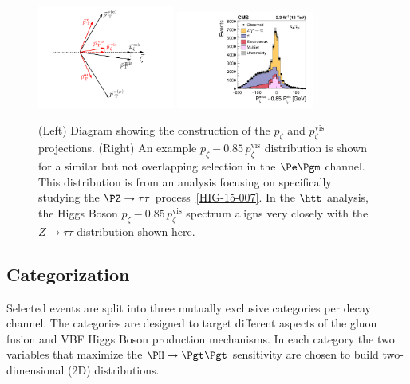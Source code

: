 \begin{figure}[htbp]
\centering
     \includegraphics[width=0.4\textwidth]{higgs_to_taus/plots/pZeta_def.pdf}
     \includegraphics[width=0.4\textwidth]{higgs_to_taus/plots/htt_em_pZeta.pdf}\\
     \caption{
(Left) Diagram showing the construction of the $p_\zeta$ and $p_\zeta^{\text{vis}}$ projections.
(Right) An example $p_\zeta - 0.85 \, p_\zeta^{\text{vis}}$ distribution is shown for a similar but not
overlapping selection in the $\Pe\Pgm$ channel.  This distribution is from an analysis focusing on specifically studying the
$\PZ\to\tau\tau$ process~\ref{HIG-15-007}.
In the $\htt$ analysis, the Higgs Boson $p_\zeta - 0.85 \, p_\zeta^{\text{vis}}$
spectrum aligns very closely with the $Z\to\tau\tau$ distribution shown here.
     }
     \label{fig:htt_pZeta}
\end{figure}

\subsection{Categorization}

Selected events are split into three mutually exclusive categories per decay channel.
The categories are designed to target different aspects of the gluon fusion and VBF Higgs Boson production mechanisms.
In each category the two variables that maximize the $\PH\to\Pgt\Pgt$ sensitivity are chosen to build 
two-dimensional (2D) distributions.

